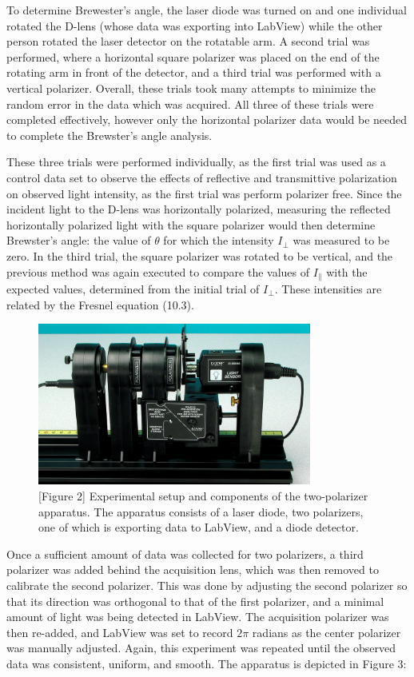 \documentclass[11pt]{article}
\begin{document}
\begin{multicols}{2}
    To determine Brewester's angle, the laser diode was turned on and one individual rotated the D-lens (whose data was exporting into LabView) while the other person rotated the laser detector on the rotatable arm. A second trial was performed, where a horizontal square polarizer was placed on the end of the rotating arm in front of the detector, and a third trial was performed with a vertical polarizer. Overall, these trials took many attempts to minimize the random error in the data which was acquired. All three of these trials were completed effectively, however only the horizontal polarizer data would be needed to complete the Brewster's angle analysis. 

    These three trials were performed individually, as the first trial was used as a control data set to observe the effects of reflective and transmittive polarization on observed light intensity, as the first trial was perform polarizer free. Since the incident light to the D-lens was horizontally polarized, measuring the reflected horizontally polarized light with the square polarizer would then determine Brewster's angle: the value of $\theta$ for which the intensity $I_{\perp}$ was measured to be zero. In the third trial, the square polarizer was rotated to be vertical, and the previous method was again executed to compare the values of $I_{\parallel}$ with the expected values, determined from the initial trial of $I_{\perp}$. These intensities are related by the Fresnel equation (10.3). 



    \begin{figure}[H]
        \centering
        \includegraphics[width=9cm]{2 polarizers.png}
        \caption*{[Figure 2] Experimental setup and components of the two-polarizer apparatus. The apparatus consists of a laser diode, two polarizers, one of which is exporting data to LabView, and a diode detector.}
    \end{figure}

    Once a sufficient amount of data was collected for two polarizers, a third polarizer was added behind the acquisition lens, which was then removed to calibrate the second polarizer. This was done by adjusting the second polarizer so that its direction was orthogonal to that of the first polarizer, and a minimal amount of light was being detected in LabView. The acquisition polarizer was then re-added, and LabView was set to record $2\pi$ radians as the center polarizer was manually adjusted. Again, this experiment was repeated until the observed data was consistent, uniform, and smooth. The apparatus is depicted in Figure 3:


\end{multicols}
\end{document}
